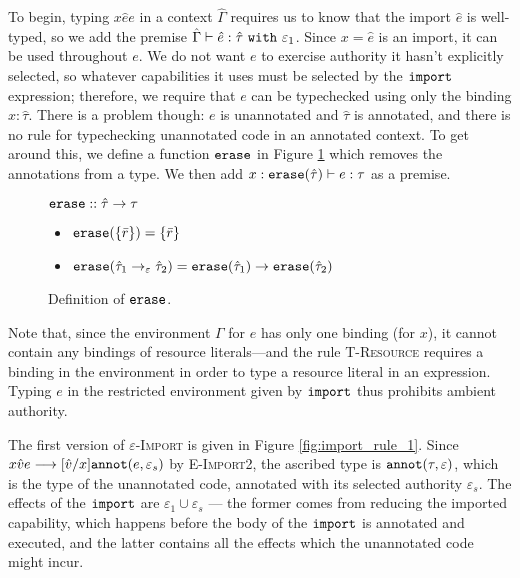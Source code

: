To begin, typing ${x}{\hat e}{e}$ in a context
$\hat \Gamma$ requires us to know that the import $\hat e$ is
well-typed, so we add the premise
$\hat \Gamma \vdash \hat e: \hat \tau~\mathtt{with}~ \varepsilon_1$. Since
$x = \hat e$ is an import, it can be used throughout $e$. We do not
want $e$ to exercise authority it hasn't explicitly selected, so
whatever capabilities it uses must be selected by the $\mathtt{import}$
expression; therefore, we require that $e$ can be typechecked using
only the binding $x: \hat \tau$. There is a problem though: $e$ is
unannotated and $\hat \tau$ is annotated, and there is no rule for
typechecking unannotated code in an annotated context. To get around
this, we define a function $\mathtt{erase}$ in Figure
\ref{fig:erase_defn} which removes the annotations from a type. We
then add $x: \mathtt{erase}(\hat \tau) \vdash e: \tau$ as a premise.

\begin{figure}
$\mathtt{erase} :: \hat \tau \rightarrow \tau$
\begin{itemize}
	\setlength\itemsep{-0.2em}
	\item[] $\mathtt{erase}(\{ \bar r \}) = \{ \bar r \}$
	\item[] $\mathtt{erase}(\hat \tau_1 \rightarrow_{\varepsilon} \hat \tau_2) = \mathtt{erase}(\hat \tau_1) \rightarrow \mathtt{erase}(\hat \tau_2)$
\end{itemize}

\vspace{-0.5cm}
\caption{Definition of $\mathtt{erase}$.}
\vspace{-0.5cm}
\label{fig:erase_defn}
\end{figure}

Note that, since the environment $\Gamma$ for $e$ has only one binding
(for $x$), it cannot contain any bindings of resource literals---and
the rule \textsc{T-Resource} requires a binding in the environment in
order to type a resource literal in an expression. Typing $e$ in the
restricted environment given by $\mathtt{import}$ thus prohibits ambient
authority.

The first version of \textsc{$\varepsilon$-Import} is given in Figure
\ref{fig:import_rule_1}. Since
${x}{\hat v}{e} \longrightarrow [\hat
v/x]\mathtt{annot}(e, \varepsilon_s)$ by \textsc{E-Import2}, the ascribed type
is $\mathtt{annot}(\tau, \varepsilon)$, which is the type of the unannotated
code, annotated with its selected authority $\varepsilon_s$. The
effects of the $\mathtt{import}$ are $\varepsilon_1 \cup \varepsilon_s$
--- the former comes from reducing the imported capability, which
happens before the body of the $\mathtt{import}$ is annotated and
executed, and the latter contains all the effects which the
unannotated code might incur.

